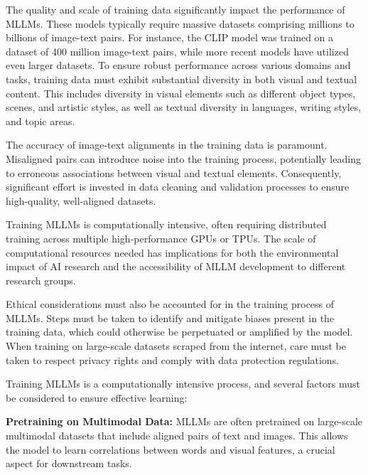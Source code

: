 The quality and scale of training data significantly impact the performance of MLLMs. These models typically require massive datasets comprising millions to billions of image-text pairs. For instance, the CLIP model was trained on a dataset of 400 million image-text pairs, while more recent models have utilized even larger datasets. To ensure robust performance across various domains and tasks, training data must exhibit substantial diversity in both visual and textual content. This includes diversity in visual elements such as different object types, scenes, and artistic styles, as well as textual diversity in languages, writing styles, and topic areas.

The accuracy of image-text alignments in the training data is paramount. Misaligned pairs can introduce noise into the training process, potentially leading to erroneous associations between visual and textual elements. Consequently, significant effort is invested in data cleaning and validation processes to ensure high-quality, well-aligned datasets.

Training MLLMs is computationally intensive, often requiring distributed training across multiple high-performance GPUs or TPUs. The scale of computational resources needed has implications for both the environmental impact of AI research and the accessibility of MLLM development to different research groups.

Ethical considerations must also be accounted for in the training process of MLLMs. Steps must be taken to identify and mitigate biases present in the training data, which could otherwise be perpetuated or amplified by the model. When training on large-scale datasets scraped from the internet, care must be taken to respect privacy rights and comply with data protection regulations.

Training MLLMs is a computationally intensive process, and several factors must be considered to ensure effective learning:

\textbf{Pretraining on Multimodal Data:} MLLMs are often pretrained on large-scale multimodal datasets that include aligned pairs of text and images. This allows the model to learn correlations between words and visual features, a crucial aspect for downstream tasks.

